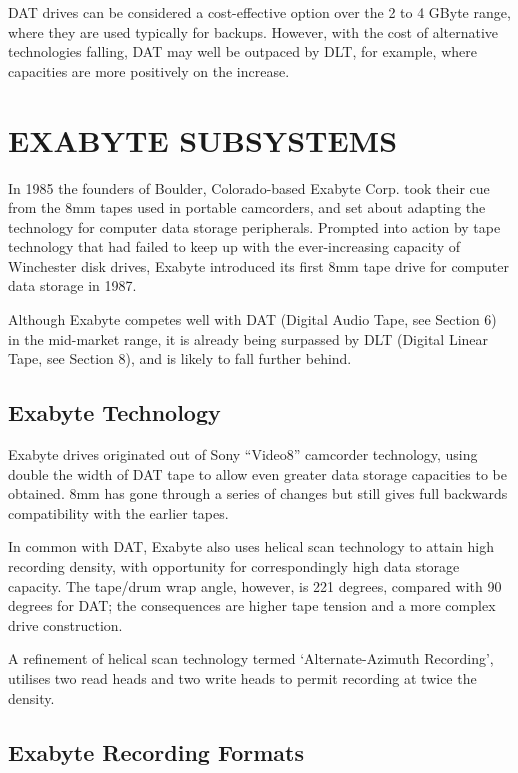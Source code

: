\documentclass[11pt]{article}
\begin{document}
DAT drives can be considered a cost-effective option over the 2 to 4 GByte
range, where they are used typically for backups. However, with the cost of
alternative technologies falling, DAT may well be outpaced by DLT, for
example, where capacities are more positively on the increase.

\section {EXABYTE SUBSYSTEMS}

In 1985 the founders of Boulder, Colorado-based Exabyte Corp. took their cue
from the 8mm tapes used in portable camcorders, and set about adapting the
technology for computer data storage peripherals. Prompted into action by
tape technology that had failed to keep up with the ever-increasing capacity
of Winchester disk drives, Exabyte introduced its first 8mm tape drive for
computer data storage in 1987.

Although Exabyte competes well with DAT (Digital Audio Tape, see Section 6)
in the mid-market range, it is already being surpassed by DLT (Digital Linear
Tape, see Section 8), and is likely to fall further behind.

\subsection {Exabyte Technology}

Exabyte drives originated out of Sony ``Video8'' camcorder technology, using
double the width of DAT tape to allow even greater data storage capacities
to be obtained. 8mm has gone through a series of changes but still gives
full backwards compatibility with the earlier tapes.

In common with DAT, Exabyte also uses helical scan technology to attain high
recording density, with opportunity for correspondingly high data storage
capacity. The tape/drum wrap angle, however, is 221 degrees, compared with
90 degrees for DAT; the consequences are higher tape tension and a more
complex drive construction.

A refinement of helical scan technology termed `Alternate-Azimuth Recording',
utilises two read heads and two write heads to permit recording at twice the
density.

\subsection {Exabyte Recording Formats}
\end{document}
